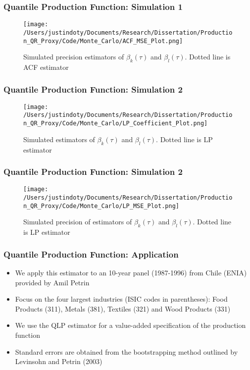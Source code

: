 \documentclass{beamer}
\begin{document}

\begin{frame}
\frametitle{Quantile Production Function: Simulation 1}
\begin{figure}[H]
\centering
\caption{Simulated precision estimators of $\beta_{k}(\tau)$ and $\beta_{l}(\tau)$. Dotted line is ACF estimator}
\texttt{[image: /Users/justindoty/Documents/Research/Dissertation/Production\_QR\_Proxy/Code/Monte\_Carlo/ACF\_MSE\_Plot.png]}
\end{figure}
\end{frame}

\begin{frame}
\frametitle{Quantile Production Function: Simulation 2}
\begin{figure}[H]
\centering
\caption{Simulated estimators of $\beta_{k}(\tau)$ and $\beta_{l}(\tau)$. Dotted line is LP estimator}
\texttt{[image: /Users/justindoty/Documents/Research/Dissertation/Production\_QR\_Proxy/Code/Monte\_Carlo/LP\_Coefficient\_Plot.png]}
\end{figure}
\end{frame}



\begin{frame}
\frametitle{Quantile Production Function: Simulation 2}
\begin{figure}[H]
\centering
\caption{Simulated precision of estimators of $\beta_{k}(\tau)$ and $\beta_{l}(\tau)$. Dotted line is LP estimator}
\texttt{[image: /Users/justindoty/Documents/Research/Dissertation/Production\_QR\_Proxy/Code/Monte\_Carlo/LP\_MSE\_Plot.png]}
\end{figure}
\end{frame}



\begin{frame}
\frametitle{Quantile Production Function: Application}
\begin{itemize}
	\item We apply this estimator to an 10-year panel (1987-1996) from Chile (ENIA) provided by Amil Petrin 
	\item Focus on the four largest industries (ISIC codes in parentheses): Food Products (311), Metals (381), Textiles (321) and Wood Products (331)
	\item We use the QLP estimator for a value-added specification of the production function
	\item Standard errors are obtained from the bootstrapping method outlined by Levinsohn and Petrin (2003)
\end{itemize}
\end{frame}
\end{document}
